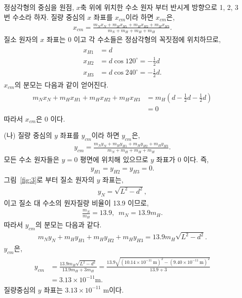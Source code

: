 \documentclass[floatfix,nofootinbib,superscriptaddress,fleqn]{revtex4-2}
\begin{document}
\begin{itemize}
  정삼각형의 중심을 원점, 
  $x$축 위에 위치한 수소 원자 부터 반시계 방향으로 1, 2, 3번 수소라 
  하자. 질량 중심의 $x$ 좌표를 $x_{cm}$이라 하면 $x_{cm}$은,
  \begin{align}
    x_{cm} = \frac{m_{N}x_{N} + m_{H}x_{H1} + m_{H}x_{H2} + m_{H}x_{H3}}
    {m_{N} + m_{H} + m_{H} + m_{H}}.
  \end{align}
  질소 원자의 $x$ 좌표는 0 이고 각 수소들은 정삼각형의 꼭짓점에 위치하므로,
  \begin{align}
    \begin{split}
      x_{H1} &= d  \\
      x_{H2} &= d\cos{120^\circ} =-\frac{1}{2}d \\
      x_{H3} &= d\cos{240^\circ} =-\frac{1}{2}d .
    \end{split}
  \end{align}
  $x_{cm}$의 분모는 다음과 같이 얻어진다.
  \begin{align}
    \begin{split}
      m_{N}x_{N} + m_{H}x_{H1} + m_{H}x_{H2} + m_{H}x_{H3}
      &=m_{H}\left(d -\frac{1}{2}d -\frac{1}{2}d\right) \\
      &=0
    \end{split}
  \end{align}
  따라서 $x_{cm}$은 0 이다.
  \item[(나)] 질량 중심의 $y$ 좌표를 $y_{cm}$이라 하면 $y_{cm}$은,
  \begin{align}
    y_{cm} = \frac{m_{N}y_{N} + m_{H}y_{H1} + m_{H}y_{H2} + m_{H}y_{H3}}
    {m_{N} + m_{H} + m_{H} + m_{H}}.
  \end{align}
  모든 수소 원자들은 $y=0$ 평면에 위치해 있으므로 $y$ 좌표가 0 이다. 즉,
  \begin{align}
    y_{H1}=y_{H2}=y_{H3}=0.
  \end{align}
  그림~\ref{fig:3}로 부터 질소 원자의 $y$ 좌표는,
  \begin{align}
    y_{N} = \sqrt{L^2-d^2},
  \end{align}
  이고 질소 대 수소의 원자질량 비율이 13.9 이므로,
  \begin{align}
    \frac{m_N}{m_H} = 13.9,\,\,\,m_{N}=13.9m_{H}.
  \end{align}
  따라서 $y_{cm}$의 분모는 다음과 같다.
  \begin{align}
    m_{N}y_{N} + m_{H}y_{H1} + m_{H}y_{H2} + m_{H}y_{H3}=
    13.9m_{H}\sqrt{L^2-d^2}.
  \end{align}
  $y_{cm}$은,
  \begin{align}
    \begin{split}
      y_{cm} &= \frac{13.9m_{H}\sqrt{L^2-d^2}}{13.9m_{H} + 3m_{H}}
      = \frac{13.9\sqrt{(10.14\times 10^{-11}\,\mathrm{m})^2
      -(9.40\times 10^{-11}\,\mathrm{m})^2}}{13.9 + 3}  \\
      &= 3.13\times10^{-11}\mathrm{m}.
    \end{split}
  \end{align}
  질량중심의 $y$ 좌표는 $3.13\times10^{-11}$ m이다.
\end{itemize}
\end{document}
